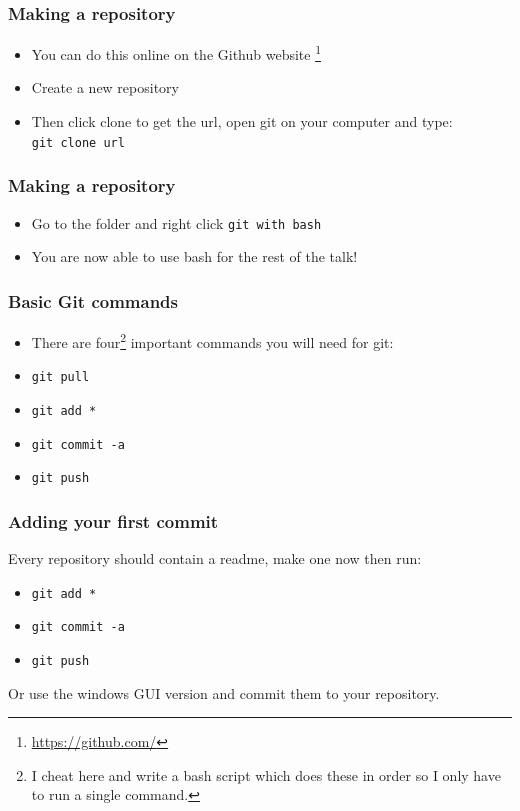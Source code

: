 \documentclass{beamer}
\begin{document}
\begin{frame}
\frametitle{Making a repository}
\begin{itemize}
\item You can do this online on the Github website \footnote{\url{https://github.com/}}
\item Create a new repository
\item Then click clone to get the url, open git on your computer and type: \\ 
	\texttt{git clone url}
\end{itemize}
\end{frame}

\begin{frame}
\frametitle{Making a repository}
\begin{itemize}
	\item Go to the folder and right click \texttt{git with bash}
\item You are now able to use bash for the rest of the talk!
\end{itemize}
\end{frame}

\begin{frame}
\frametitle{Basic Git commands}
\begin{itemize}
	\item There are four\footnote{I cheat here and write a bash script which does these in order so I only have to run a single command.} important commands you will need for git:
	\item \texttt{git pull}
	\item \texttt{git add *}
	\item \texttt{git commit -a}
	\item \texttt{git push}
\end{itemize}
\end{frame}

\begin{frame}
	\frametitle{Adding your first commit}
    Every repository should contain a readme, make one now then run:
\begin{itemize}
	\item \texttt{git add *}
	\item \texttt{git commit -a}
	\item \texttt{git push}
\end{itemize}

Or use the windows GUI version and commit them to your repository.
\end{frame}
\end{document}
